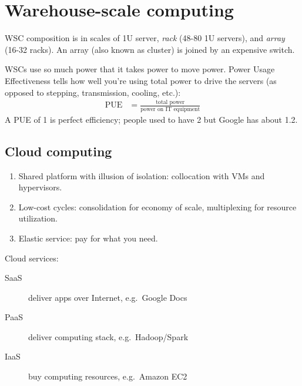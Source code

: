 \chapter{Warehouse-scale computing}
WSC composition is in scales of 1U server, \emph{rack} (48-80 1U servers), and \emph{array} (16-32 racks).
An array (also known as cluster) is joined by an expensive switch.

WSCs use so much power that it takes power to move power. Power Usage Effectiveness tells how well you're using total power to drive the servers (as opposed to stepping, transmission, cooling, etc.):
\begin{align}
\text{PUE} &= \frac{\text{total power}}{\text{power on IT equipment}}
\end{align}
A PUE of 1 is perfect efficiency; people used to have 2 but Google has about 1.2.


\section{Cloud computing}
\begin{enumerate}
	\item Shared platform with illusion of isolation: collocation with VMs and hypervisors.
	\item Low-cost cycles: consolidation for economy of scale, multiplexing for resource utilization.
	\item Elastic service: pay for what you need.
\end{enumerate}

Cloud services:
\begin{description}
	\item[SaaS] deliver apps over Internet, e.g.~Google Docs
	\item[PaaS] deliver computing stack, e.g.~Hadoop/Spark
	\item[IaaS] buy computing resources, e.g.~Amazon EC2
\end{description}

